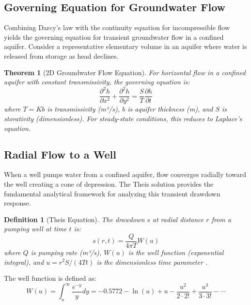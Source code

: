 \documentclass[a4paper, 11pt]{article}
\newtheorem{definition}{Definition}[section]
\newtheorem{theorem}{Theorem}[section]
\begin{document}
\subsection{Governing Equation for Groundwater Flow}

Combining Darcy's law with the continuity equation for incompressible flow yields the governing
equation for transient groundwater flow in a confined aquifer. Consider a representative
elementary volume in an aquifer where water is released from storage as head declines.

\begin{theorem}[2D Groundwater Flow Equation]
For horizontal flow in a confined aquifer with constant transmissivity, the governing equation is:
\begin{equation}
\frac{\partial^2 h}{\partial x^2} + \frac{\partial^2 h}{\partial y^2} = \frac{S}{T} \frac{\partial h}{\partial t}
\end{equation}
where $T = Kb$ is transmissivity (m²/s), $b$ is aquifer thickness (m), and $S$ is storativity
(dimensionless). For steady-state conditions, this reduces to Laplace's equation.
\end{theorem}

\subsection{Radial Flow to a Well}

When a well pumps water from a confined aquifer, flow converges radially toward the well
creating a cone of depression. The Theis solution provides the fundamental analytical framework
for analyzing this transient drawdown response.

\begin{definition}[Theis Equation]
The drawdown $s$ at radial distance $r$ from a pumping well at time $t$ is:
\begin{equation}
s(r, t) = \frac{Q}{4\pi T} W(u)
\end{equation}
where $Q$ is pumping rate (m³/s), $W(u)$ is the well function (exponential integral), and
$u = r^2 S / (4Tt)$ is the dimensionless time parameter \cite{theis1935relation}.
\end{definition}

The well function is defined as:
\begin{equation}
W(u) = \int_u^\infty \frac{e^{-y}}{y} dy = -0.5772 - \ln(u) + u - \frac{u^2}{2 \cdot 2!} + \frac{u^3}{3 \cdot 3!} - \cdots
\end{equation}
\end{document}
